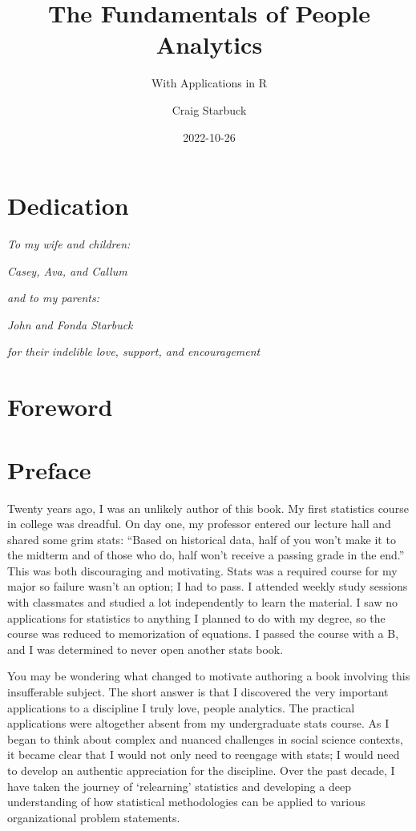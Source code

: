 \documentclass[
]{book}
\title{The Fundamentals of People Analytics}
\subtitle{With Applications in R}
\author{Craig Starbuck}
\date{2022-10-26}
\begin{document}
\maketitle

{
\setcounter{tocdepth}{1}
\tableofcontents
}
\hypertarget{dedication}{%
\chapter*{Dedication}\label{dedication}}

\emph{To my wife and children:}

\emph{Casey, Ava, and Callum}

\emph{and to my parents:}

\emph{John and Fonda Starbuck}

\emph{for their indelible love, support, and encouragement}

\hypertarget{foreword}{%
\chapter*{Foreword}\label{foreword}}

\hypertarget{preface}{%
\chapter*{Preface}\label{preface}}

Twenty years ago, I was an unlikely author of this book. My first statistics course in college was dreadful. On day one, my professor entered our lecture hall and shared some grim stats: ``Based on historical data, half of you won't make it to the midterm and of those who do, half won't receive a passing grade in the end.'' This was both discouraging and motivating. Stats was a required course for my major so failure wasn't an option; I had to pass. I attended weekly study sessions with classmates and studied a lot independently to learn the material. I saw no applications for statistics to anything I planned to do with my degree, so the course was reduced to memorization of equations. I passed the course with a B, and I was determined to never open another stats book.

You may be wondering what changed to motivate authoring a book involving this insufferable subject. The short answer is that I discovered the very important applications to a discipline I truly love, people analytics. The practical applications were altogether absent from my undergraduate stats course. As I began to think about complex and nuanced challenges in social science contexts, it became clear that I would not only need to reengage with stats; I would need to develop an authentic appreciation for the discipline. Over the past decade, I have taken the journey of `relearning' statistics and developing a deep understanding of how statistical methodologies can be applied to various organizational problem statements.
\end{document}
